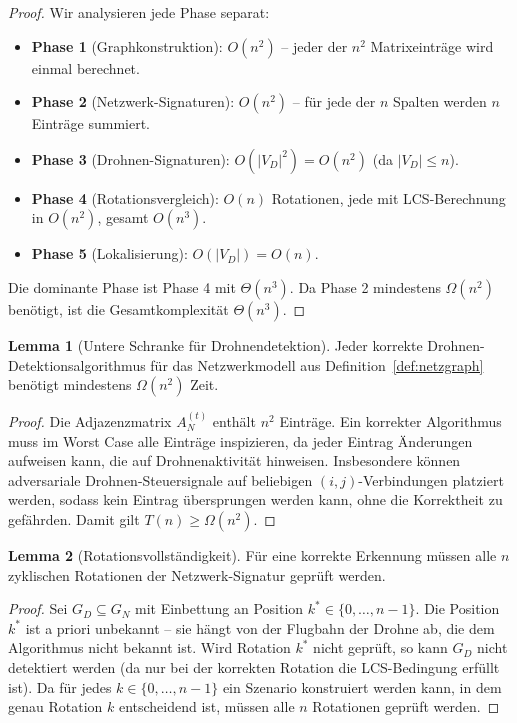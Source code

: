 ﻿\documentclass[a4paper,12pt]{article}
\theoremstyle{definition}
\newtheorem{lemma}{Lemma}
\begin{document}
\begin{proof}
    Wir analysieren jede Phase separat:
    \begin{itemize}
        \item \textbf{Phase 1} (Graphkonstruktion): $O(n^2)$ -- jeder der
              $n^2$ Matrixeintr\"age wird einmal berechnet.
        \item \textbf{Phase 2} (Netzwerk-Signaturen): $O(n^2)$ -- f\"ur jede
              der $n$ Spalten werden $n$ Eintr\"age summiert.
        \item \textbf{Phase 3} (Drohnen-Signaturen): $O(|V_D|^2) = O(n^2)$
              (da $|V_D| \leq n$).
        \item \textbf{Phase 4} (Rotationsvergleich): $O(n)$ Rotationen,
              jede mit LCS-Berechnung in $O(n^2)$, gesamt $O(n^3)$.
        \item \textbf{Phase 5} (Lokalisierung): $O(|V_D|) = O(n)$.
    \end{itemize}
    Die dominante Phase ist Phase 4 mit $\Theta(n^3)$. Da Phase 2 mindestens
    $\Omega(n^2)$ ben\"otigt, ist die Gesamtkomplexit\"at $\Theta(n^3)$.
\end{proof}

\begin{lemma}[Untere Schranke f\"ur Drohnendetektion]
\label{lem:untere}
    Jeder korrekte Drohnen-Detektionsalgorithmus f\"ur das Netzwerkmodell
    aus Definition~\ref{def:netzgraph} ben\"otigt mindestens $\Omega(n^2)$ Zeit.
\end{lemma}

\begin{proof}
    Die Adjazenzmatrix $A_N^{(t)}$ enth\"alt $n^2$ Eintr\"age. Ein korrekter
    Algorithmus muss im Worst Case alle Eintr\"age inspizieren, da jeder Eintrag
    \"Anderungen aufweisen kann, die auf Drohnenaktivit\"at hinweisen.
    Insbesondere k\"onnen adversariale Drohnen-Steuersignale auf beliebigen
    $(i,j)$-Verbindungen platziert werden, sodass kein Eintrag \"ubersprungen
    werden kann, ohne die Korrektheit zu gef\"ahrden. Damit gilt
    $T(n) \geq \Omega(n^2)$.
\end{proof}

\begin{lemma}[Rotationsvollst\"andigkeit]
\label{lem:rotation}
    F\"ur eine korrekte Erkennung m\"ussen alle $n$ zyklischen Rotationen der
    Netzwerk-Signatur gepr\"uft werden.
\end{lemma}

\begin{proof}
    Sei $G_D \subseteq G_N$ mit Einbettung an Position $k^* \in \{0, \ldots, n-1\}$.
    Die Position $k^*$ ist a priori unbekannt -- sie h\"angt von der Flugbahn
    der Drohne ab, die dem Algorithmus nicht bekannt ist. Wird Rotation $k^*$
    nicht gepr\"uft, so kann $G_D$ nicht detektiert werden (da nur bei der
    korrekten Rotation die LCS-Bedingung erf\"ullt ist). Da f\"ur jedes
    $k \in \{0, \ldots, n-1\}$ ein Szenario konstruiert werden kann, in dem
    genau Rotation $k$ entscheidend ist, m\"ussen alle $n$ Rotationen gepr\"uft werden.
\end{proof}
\end{document}
